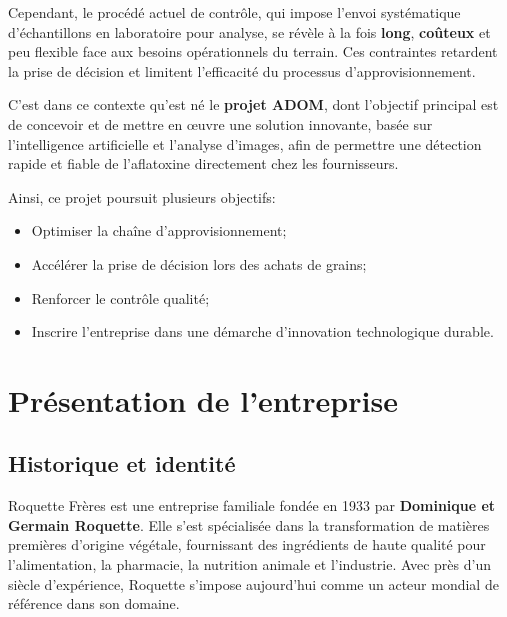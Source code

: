 \documentclass[12pt,a4paper]{report}
\begin{document}
\medskip
\noindent
Cependant, le procédé actuel de contrôle, qui impose l’envoi systématique d’échantillons en laboratoire pour analyse,
se révèle à la fois \textbf{long}, \textbf{coûteux} et peu flexible face aux besoins opérationnels du terrain.
Ces contraintes retardent la prise de décision et limitent l’efficacité du processus d’approvisionnement.

\medskip
\noindent
C’est dans ce contexte qu’est né le \textbf{projet ADOM}, dont l’objectif principal est de concevoir et de mettre en œuvre
une solution innovante, basée sur l’intelligence artificielle et l’analyse d’images,
afin de permettre une détection rapide et fiable de l’aflatoxine directement chez les fournisseurs.

\medskip
\noindent
Ainsi, ce projet poursuit plusieurs objectifs:
\begin{itemize}
    \item Optimiser la chaîne d’approvisionnement;
    \item Accélérer la prise de décision lors des achats de grains;
    \item Renforcer le contrôle qualité;
    \item Inscrire l’entreprise dans une démarche d’innovation technologique durable.
\end{itemize}
\clearpage

\section{Présentation de l’entreprise}

\subsection*{Historique et identité}
Roquette Frères est une entreprise familiale fondée en 1933 par \textbf{Dominique et Germain Roquette}.
Elle s’est spécialisée dans la transformation de matières premières d’origine végétale,
fournissant des ingrédients de haute qualité pour l’alimentation, la pharmacie,
la nutrition animale et l’industrie.
Avec près d’un siècle d’expérience, Roquette s’impose aujourd’hui comme un acteur mondial de référence
dans son domaine.
\end{document}
